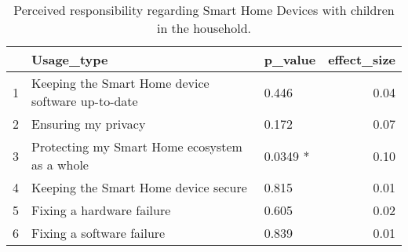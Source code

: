 \begin{table}[ht]
\centering
\begin{tabular}{rllr}
  \hline
 & Usage\_type & p\_value & effect\_size \\ 
  \hline
1 & Keeping the Smart Home device software up-to-date & 0.446   & 0.04 \\ 
  2 & Ensuring my privacy & 0.172   & 0.07 \\ 
  3 & Protecting my Smart Home ecosystem as a whole & 0.0349 * & 0.10 \\ 
  4 & Keeping the Smart Home device secure & 0.815   & 0.01 \\ 
  5 & Fixing a hardware failure & 0.605   & 0.02 \\ 
  6 & Fixing a software failure & 0.839   & 0.01 \\ 
   \hline
\end{tabular}
\caption{Perceived responsibility regarding Smart Home Devices with children in the household.} 
\label{RQ3_H3_PerceivedResponsibilityChildren}
\end{table}
